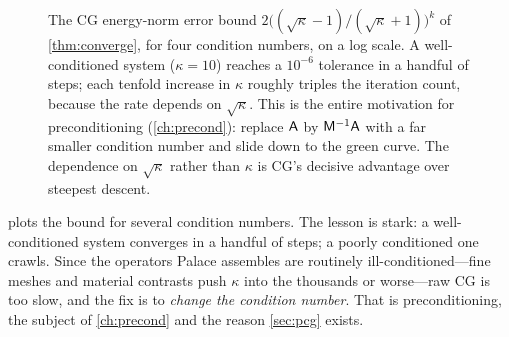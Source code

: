 \begin{figure}[t]
\centering
{}
\caption[CG convergence versus condition number]{The CG energy-norm error bound
$2\big((\sqrt\kappa-1)/(\sqrt\kappa+1)\big)^k$ of \cref{thm:converge}, for four
condition numbers, on a log scale. A well-conditioned system ($\kappa=10$) reaches
a $10^{-6}$ tolerance in a handful of steps; each tenfold increase in $\kappa$
roughly triples the iteration count, because the rate depends on $\sqrt\kappa$.
This is the entire motivation for preconditioning (\cref{ch:precond}): replace
$\mathsf{A}$ by $\mathsf{M}^{-1}\mathsf{A}$ with a far smaller condition number and slide
down to the green curve. The dependence on $\sqrt\kappa$ rather than $\kappa$ is
CG's decisive advantage over steepest descent.}
\label{fig:convplot}
\end{figure}

 plots the bound for several condition numbers. The lesson is
stark: a well-conditioned system converges in a handful of steps; a poorly
conditioned one crawls. Since the operators Palace assembles are routinely
ill-conditioned---fine meshes and material contrasts push $\kappa$ into the
thousands or worse---raw CG is too slow, and the fix is to \emph{change the
condition number}. That is preconditioning, the subject of \cref{ch:precond} and
the reason \cref{sec:pcg} exists.

